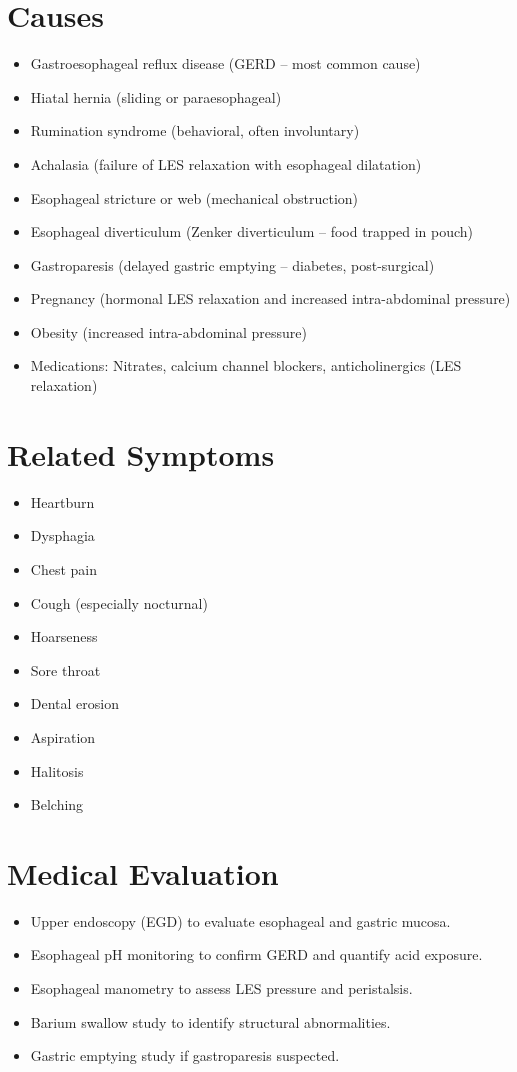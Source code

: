 \section*{Causes}
\begin{itemize}
  \item Gastroesophageal reflux disease (GERD -- most common cause)
  \item Hiatal hernia (sliding or paraesophageal)
  \item Rumination syndrome (behavioral, often involuntary)
  \item Achalasia (failure of LES relaxation with esophageal dilatation)
  \item Esophageal stricture or web (mechanical obstruction)
  \item Esophageal diverticulum (Zenker diverticulum -- food trapped in pouch)
  \item Gastroparesis (delayed gastric emptying -- diabetes, post-surgical)
  \item Pregnancy (hormonal LES relaxation and increased intra-abdominal pressure)
  \item Obesity (increased intra-abdominal pressure)
  \item Medications: Nitrates, calcium channel blockers, anticholinergics (LES relaxation)
\end{itemize}

\section*{Related Symptoms}
\begin{itemize}
  \item Heartburn
  \item Dysphagia
  \item Chest pain
  \item Cough (especially nocturnal)
  \item Hoarseness
  \item Sore throat
  \item Dental erosion
  \item Aspiration
  \item Halitosis
  \item Belching
\end{itemize}

\section*{Medical Evaluation}
\begin{itemize}
  \item Upper endoscopy (EGD) to evaluate esophageal and gastric mucosa.
  \item Esophageal pH monitoring to confirm GERD and quantify acid exposure.
  \item Esophageal manometry to assess LES pressure and peristalsis.
  \item Barium swallow study to identify structural abnormalities.
  \item Gastric emptying study if gastroparesis suspected.
\end{itemize}


